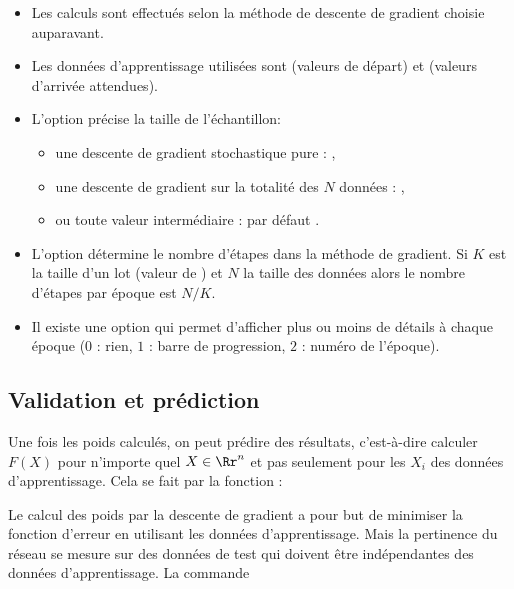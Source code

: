 \documentclass[11pt,class=report,crop=false]{standalone}
\begin{document}
\begin{itemize}
  \item Les calculs sont effectués selon la méthode de descente de gradient choisie auparavant.
  
  \item Les données d'apprentissage utilisées sont  (valeurs de départ) et  (valeurs d'arrivée attendues).
  
  \item L'option  précise la taille de l'échantillon:
  \begin{itemize}
      \item une descente de gradient stochastique pure : ,
      \item une descente de gradient sur la totalité des $N$ données : ,
      \item ou toute valeur intermédiaire : par défaut .
  \end{itemize}
  
  \item L'option  détermine le nombre d'étapes dans la méthode de gradient. 
  Si $K$ est la taille d'un lot (valeur de ) et $N$ la taille des données alors
  le nombre d'étapes par époque est $N/K$.
  
  \item Il existe une option  qui permet d'afficher plus ou moins de détails à chaque époque
  ($0$ : rien, $1$ : barre de progression, $2$ : numéro de l'époque).
\end{itemize}

  
\subsection{Validation et prédiction}

Une fois les poids calculés, on peut prédire des résultats, c'est-à-dire calculer $F(X)$ pour n'importe quel $X \in \Rr^n$ et pas seulement pour les $X_i$ des données d'apprentissage.
Cela se fait par la fonction  :

\bigskip

Le calcul des poids par la descente de gradient a pour but de minimiser la fonction d'erreur en utilisant les données d'apprentissage. Mais la pertinence du réseau se mesure sur des données de test qui doivent être indépendantes des données d'apprentissage. La commande
\end{document}
